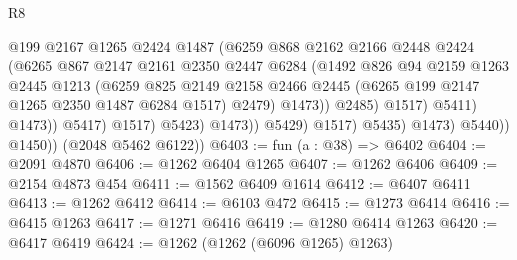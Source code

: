 \begin{lexlean}{R8}
\begin{coremodule}
                                        @199
                                        @2167
                                        @1265
                                        @2424
                                        @1487
                                        (@6259
                                          @868
                                          @2162
                                          @2166
                                          @2448
                                          @2424
                                          (@6265
                                            @867
                                            @2147
                                            @2161
                                            @2350
                                            @2447
                                            @6284
                                            (@1492
                                              @826
                                              @94
                                              @2159
                                              @1263
                                              @2445
                                              @1213
                                              (@6259
                                                @825
                                                @2149
                                                @2158
                                                @2466
                                                @2445
                                                (@6265 @199 @2147 @1265 @2350 @1487 @6284 @1517)
                                                @2479)
                                              @1473))
                                          @2485)
                                        @1517)
                                      @5411)
                                    @1473))
                                @5417)
                              @1517)
                            @5423)
                          @1473))
                      @5429)
                    @1517)
                  @5435)
                @1473)
              @5440))
          @1450))
      (@2048 @5462 @6122))
@6403 := fun (a : @38) => @6402
@6404 := @2091 @4870
@6406 := @1262 @6404 @1265
@6407 := @1262 @6406
@6409 := @2154 @4873 @454
@6411 := @1562 @6409 @1614
@6412 := @6407 @6411
@6413 := @1262 @6412
@6414 := @6103 @472
@6415 := @1273 @6414
@6416 := @6415 @1263
@6417 := @1271 @6416
@6419 := @1280 @6414 @1263
@6420 := @6417 @6419
@6424 := @1262 (@1262 (@6096 @1265) @1263)

\end{coremodule}
\end{lexlean}
